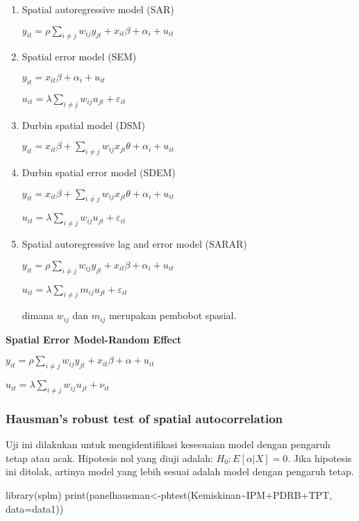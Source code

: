 \documentclass[
]{book}
\newenvironment{Shaded}{\begin{snugshade}}{\end{snugshade}}
\newcommand{\AttributeTok}[1]{\textcolor[rgb]{0.77,0.63,0.00}{#1}}
\newcommand{\FunctionTok}[1]{\textcolor[rgb]{0.00,0.00,0.00}{#1}}
\newcommand{\NormalTok}[1]{#1}
\newcommand{\OtherTok}[1]{\textcolor[rgb]{0.56,0.35,0.01}{#1}}
\newcommand{\SpecialCharTok}[1]{\textcolor[rgb]{0.00,0.00,0.00}{#1}}
\begin{document}
\begin{enumerate}
\def\labelenumi{(\arabic{enumi})}
\item
  Spatial autoregressive model (SAR)

  \(y_{it}=\rho\sum_{i \ne j} w_{ij} y_{jt} + x_{it}\beta + \alpha_i + u_{it}\)
\item
  Spatial error model (SEM)

  \(y_{it}= x_{it}\beta + \alpha_i + u_{it}\)

  \(u_{it}=\lambda \sum_{i \ne j} w_{ij} u_{jt} + \varepsilon_{it}\)
\item
  Durbin spatial model (DSM)

  \(y_{it}=x_{it}\beta + \sum_{i \ne j} w_{ij} x_{jt} \theta + \alpha_i + u_{it}\)
\item
  Durbin spatial error model (SDEM)

  \(y_{it}= x_{it}\beta + \sum_{i \ne j} w_{ij} x_{jt} \theta + \alpha_i + u_{it}\)

  \(u_{it}=\lambda \sum_{i \ne j} w_{ij} u_{jt} + \varepsilon_{it}\)
\item
  Spatial autoregressive lag and error model (SARAR)

  \(y_{it}=\rho\sum_{i \ne j} w_{ij} y_{jt} + x_{it}\beta + \alpha_i + u_{it}\)

  \(u_{it}=\lambda \sum_{i \ne j} m_{ij} u_{jt} + \varepsilon_{it}\)

  dimana \(w_{ij}\) dan \(m_{ij}\) merupakan pembobot spasial.
\end{enumerate}

\textbf{Spatial Error Model-Random Effect}

\(y_{it}=\rho\sum_{i \ne j} w_{ij} y_{jt} + x_{it}\beta + \alpha + u_{it}\)

\(u_{it}=\lambda \sum_{i \ne j} w_{ij} u_{jt} + \nu_{it}\)

\hypertarget{hausmans-robust-test-of-spatial-autocorrelation}{%
\subsubsection{Hausman's robust test of spatial autocorrelation}\label{hausmans-robust-test-of-spatial-autocorrelation}}

Uji ini dilakukan untuk mengidentifikasi kesesuaian model dengan pengaruh tetap atau acak. Hipotesis nol yang diuji adalah: \(H_0: E[\alpha|X]=0\). Jika hipotesis ini ditolak, artinya model yang lebih sesuai adalah model dengan pengaruh tetap.

\begin{Shaded}
\begin{Highlighting}[]
\FunctionTok{library}\NormalTok{(splm)}
\FunctionTok{print}\NormalTok{(panelhausman}\OtherTok{\textless{}{-}}\FunctionTok{phtest}\NormalTok{(Kemiskinan}\SpecialCharTok{\textasciitilde{}}\NormalTok{IPM}\SpecialCharTok{+}\NormalTok{PDRB}\SpecialCharTok{+}\NormalTok{TPT, }\AttributeTok{data=}\NormalTok{data1))}
\end{Highlighting}
\end{Shaded}
\end{document}
